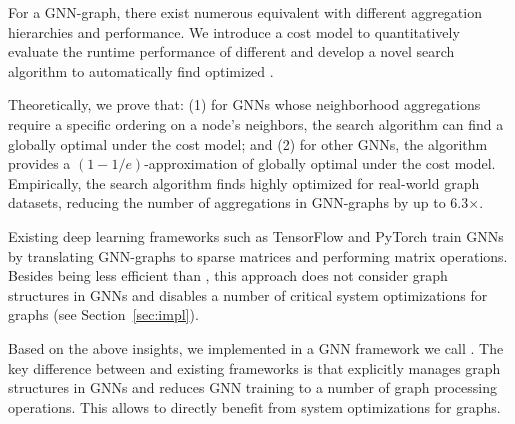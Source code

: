 
For a GNN-graph, there exist numerous equivalent \xgs with different aggregation hierarchies and performance.
We introduce a cost model to quantitatively evaluate the runtime performance of different \xgs and develop a novel \xg search algorithm to automatically find optimized \xgs.

Theoretically, we prove that: (1) for GNNs whose neighborhood aggregations require a specific ordering on a node's neighbors, the \xg search algorithm can find a globally optimal \xg under the cost model; and (2) for other GNNs, the algorithm provides a $(1-1/e)$-approximation of globally optimal \xgs under the cost model.
Empirically, the \xg search algorithm finds highly optimized \xgs for real-world graph datasets, reducing the number of aggregations in GNN-graphs by up to 6.3$\times$.

Existing deep learning frameworks such as TensorFlow and PyTorch train GNNs by translating GNN-graphs to sparse matrices and performing matrix operations.
Besides being less efficient than \xgs, this approach does not consider graph structures in GNNs and disables a number of critical system optimizations for graphs (see Section~\ref{sec:impl}).

Based on the above insights, we implemented \xg in a GNN framework we call \sys.
The key difference between \sys and existing frameworks is that \sys explicitly manages graph structures in GNNs and reduces GNN training to a number of graph processing operations. This allows \sys to directly benefit from system optimizations for graphs.


